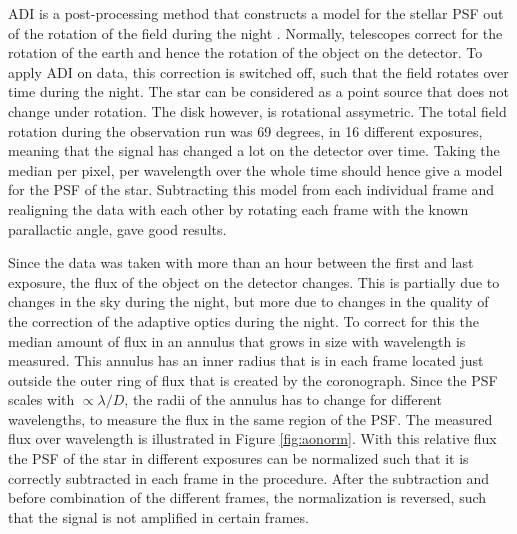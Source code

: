 \documentclass[twoside,single]{lion-msc}
\begin{document}
ADI is a post-processing method that constructs a model for the stellar PSF out of the rotation of the field during the night \cite{Marois2005}. Normally, telescopes correct for the rotation of the earth and hence the rotation of the object on the detector. To apply ADI on data, this correction is switched off, such that the field rotates over time during the night. The star can be considered as a point source that does not change under rotation. The disk however, is rotational assymetric. The total field rotation during the observation run was 69 degrees, in 16 different exposures, meaning that the signal has changed a lot on the detector over time. Taking the median per pixel, per wavelength over the whole time should hence give a model for the PSF of the star. Subtracting this model from each individual frame and realigning the data with each other by rotating each frame with the known parallactic angle, gave good results. 
\bigskip

Since the data was taken with more than an hour between the first and last exposure, the flux of the object on the detector changes. This is partially due to changes in the sky during the night, but more due to changes in the quality of the correction of the adaptive optics during the night. To correct for this the median amount of flux in an annulus that grows in size with wavelength is measured. This annulus has an inner radius that is in each frame located just outside the outer ring of flux that is created by the coronograph. Since the PSF scales with $ \propto\lambda/D$, the radii of the annulus has to change for different wavelengths, to measure the flux in the same region of the PSF. The measured flux over wavelength is illustrated in Figure \ref{fig:aonorm}. With this relative flux the PSF of the star in different exposures can be normalized such that it is correctly subtracted in each frame in the procedure. After the subtraction and before combination of the different frames, the normalization is reversed, such that the signal is not amplified in certain frames.
\end{document}
